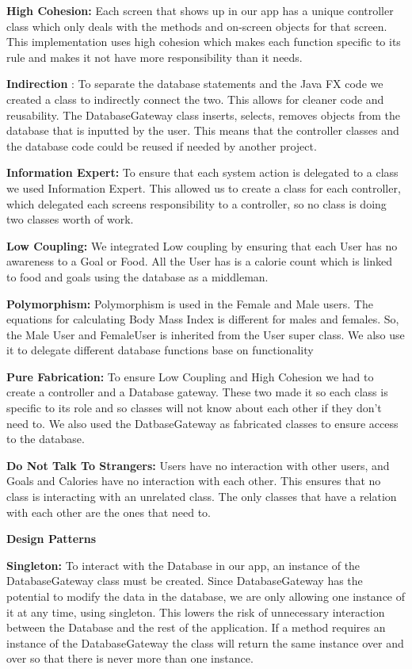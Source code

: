 \documentclass[10pt]{article}
\begin{document}
\textbf{High Cohesion:} Each screen that shows up in our app has a
unique controller class which only deals with the methods and on-screen
objects for that screen. This implementation uses high cohesion which
makes each function specific to its rule and makes it not have more
responsibility than it needs.

\textbf{Indirection} : To separate the database statements and the Java
FX code we created a class to indirectly connect the two. This allows
for cleaner code and reusability. The DatabaseGateway class inserts,
selects, removes objects from the database that is inputted by the user.
This means that the controller classes and the database code could be
reused if needed by another project.

\textbf{Information Expert:} To ensure that each system action is
delegated to a class we used Information Expert. This allowed us to
create a class for each controller, which delegated each screens
responsibility to a controller, so no class is doing two classes worth
of work.

\textbf{Low Coupling:} We integrated Low coupling by ensuring that each
User has no awareness to a Goal or Food. All the User has is a calorie
count which is linked to food and goals using the database as a
middleman.

\textbf{Polymorphism:} Polymorphism is used in the Female and Male
users. The equations for calculating Body Mass Index is different for
males and females. So, the Male User and FemaleUser is inherited from
the User super class. We also use it to delegate different database
functions base on functionality

\textbf{Pure Fabrication:} To ensure Low Coupling and High Cohesion we
had to create a controller and a Database gateway. These two made it so
each class is specific to its role and so classes will not know about
each other if they don't need to. We also used the DatbaseGateway as
fabricated classes to ensure access to the database.

\textbf{Do Not Talk To Strangers:} Users have no interaction with other
users, and Goals and Calories have no interaction with each other. This
ensures that no class is interacting with an unrelated class. The only
classes that have a relation with each other are the ones that need to.

\textbf{Design Patterns}

\textbf{Singleton:} To interact with the Database in our app, an
instance of the DatabaseGateway class must be created. Since
DatabaseGateway has the potential to modify the data in the database, we
are only allowing one instance of it at any time, using singleton. This
lowers the risk of unnecessary interaction between the Database and the
rest of the application. If a method requires an instance of the
DatabaseGateway the class will return the same instance over and over so
that there is never more than one instance.
\end{document}
